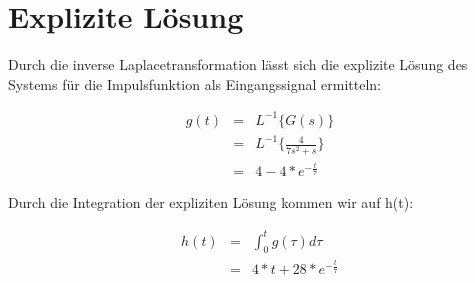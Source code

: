 \section{Explizite Lösung}

Durch die inverse Laplacetransformation lässt sich die explizite Lösung des Systems für die Impulsfunktion als Eingangssignal ermitteln:

\begin{eqnarray*}
	g(t) &=& L^{-1}\{G(s)\}  \\ 
	&=& L^{-1}\{\frac{4}{7s^2 + s}\}\\
	&=& 4 - 4*e^{-\frac{t}{7}}
\end{eqnarray*}

\noindent
Durch die Integration der expliziten Lösung kommen wir auf h(t):

\begin{eqnarray*}
	h(t) &=& \int_{0}^{t}g(\tau)d\tau \\ 
	&=& 4 * t + 28*e^{-\frac{t}{7}}
\end{eqnarray*}
